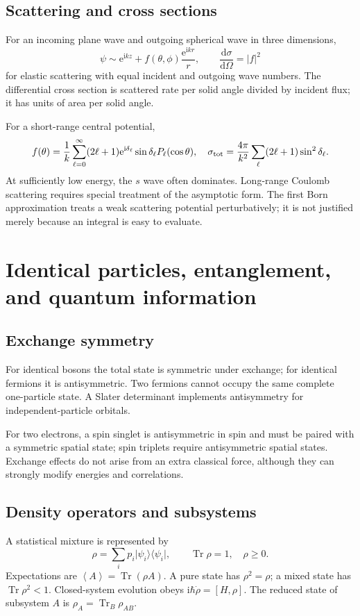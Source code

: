 \documentclass[11pt,oneside]{book}
\newcommand{\dd}{\mathrm{d}}
\newcommand{\ii}{\mathrm{i}}
\newcommand{\ee}{\mathrm{e}}
\newcommand{\avg}[1]{\left\langle #1\right\rangle}
\newcommand{\ket}[1]{\lvert #1\rangle}
\newcommand{\bra}[1]{\langle #1\rvert}
\newcommand{\od}[2]{\frac{\dd #1}{\dd #2}}
\theoremstyle{reviewstyle}
\begin{document}
\section{Scattering and cross sections}
For an incoming plane wave and outgoing spherical wave in three dimensions,
\begin{equation}\psi\sim\ee^{\ii kz}+f(\theta,\phi)\frac{\ee^{\ii kr}}r,\qquad \od{\sigma}{\Omega}=|f|^2\end{equation}
for elastic scattering with equal incident and outgoing wave numbers. The differential cross section is scattered rate per solid angle divided by incident flux; it has units of area per solid angle.

For a short-range central potential,
\begin{equation}f(\theta)=\frac1k\sum_{\ell=0}^\infty(2\ell+1)\ee^{\ii\delta_\ell}\sin\delta_\ell P_\ell(\cos\theta),\quad
\sigma_{\rm tot}=\frac{4\pi}{k^2}\sum_\ell(2\ell+1)\sin^2\delta_\ell.
\end{equation}
At sufficiently low energy, the $s$ wave often dominates. Long-range Coulomb scattering requires special treatment of the asymptotic form. The first Born approximation treats a weak scattering potential perturbatively; it is not justified merely because an integral is easy to evaluate.

\chapter{Identical particles, entanglement, and quantum information}
\section{Exchange symmetry}
For identical bosons the total state is symmetric under exchange; for identical fermions it is antisymmetric. Two fermions cannot occupy the same complete one-particle state. A Slater determinant implements antisymmetry for independent-particle orbitals.

For two electrons, a spin singlet is antisymmetric in spin and must be paired with a symmetric spatial state; spin triplets require antisymmetric spatial states. Exchange effects do not arise from an extra classical force, although they can strongly modify energies and correlations.
\section{Density operators and subsystems}
A statistical mixture is represented by
\begin{equation}\rho=\sum_i p_i\ket{\psi_i}\bra{\psi_i},\qquad \operatorname{Tr}\rho=1,\quad \rho\geq0.\end{equation}
Expectations are $\avg A=\operatorname{Tr}(\rho A)$. A pure state has $\rho^2=\rho$; a mixed state has $\operatorname{Tr}\rho^2<1$. Closed-system evolution obeys $\ii\hbar\dot\rho=[H,\rho]$. The reduced state of subsystem $A$ is $\rho_A=\operatorname{Tr}_B\rho_{AB}$.
\end{document}
